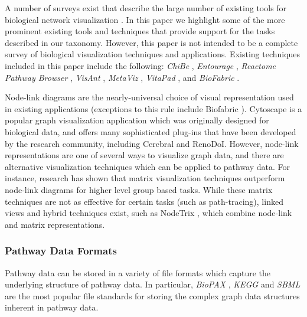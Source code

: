 A number of surveys exist that describe the large number of existing tools for biological network visualization \cite{Suderman2007tools,pavlopoulos2008survey,Gehlenborg2010omics}.
In this paper we highlight some of the more prominent existing tools and techniques that provide support for the tasks described in our taxonomy.
However, this paper is not intended to be a complete survey of biological visualization techniques and applications.
Existing techniques included in this paper include the following: \textit{ChiBe} \cite{Babur2010chibe}, \textit{Entourage} \cite{Lex2013entourage}, \textit{Reactome Pathway Browser} \cite{croft2014reactome}, \textit{VisAnt} \cite{hu2004visant}, \textit{MetaViz} \cite{bourqui2007metabolic}, \textit{VitaPad} \cite{holford2005vitapad}, and \textit{BioFabric} \cite{Longabaugh2012biofabric}.

Node-link diagrams are the nearly-universal choice of visual representation used in existing applications (exceptions to this rule include Biofabric \cite{Longabaugh2012biofabric}).
Cytoscape \cite{cytoscape} is a popular graph visualization application which was originally designed for biological data, and offers many sophisticated plug-ins that have been developed by the research community, including Cerebral\cite{Barsky2008cerebral} and RenoDoI\cite{Vehlow2015}.
However, node-link representations are one of several ways to visualize graph data, and there are alternative visualization techniques which can be applied to pathway data.
For instance, research has shown that matrix visualization techniques outperform node-link diagrams for higher level group based tasks\cite{Ghoniem2004,Henry2007}.
While these matrix techniques are not as effective for certain tasks (such as path-tracing), linked views and hybrid techniques exist, such as NodeTrix \cite{NodeTrix2007}, which combine node-link and matrix representations.

\subsubsection*{Pathway Data Formats}

Pathway data can be stored in a variety of file formats which capture the underlying structure of pathway data.
In particular, \textit{BioPAX} \cite{demir2010biopax}, \textit{KEGG} \cite{kanehisa2000kegg} and \textit{SBML} \cite{Hucka2003} are the most popular file standards for storing the complex graph data structures inherent in pathway data.

